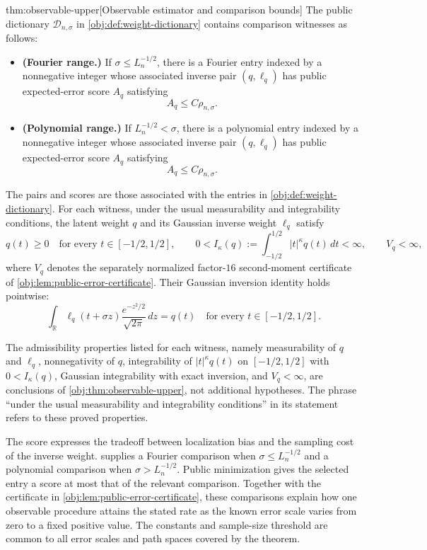 \documentclass[11pt]{article}
\begin{document}
\begin{theoremv}{thm:observable-upper}[Observable estimator and comparison bounds]
The public dictionary \(\mathcal D_{n,\sigma}\) in \cref{obj:def:weight-dictionary} contains comparison witnesses as follows:
\begin{itemize}
\item \textbf{(Fourier range.)} If \(\sigma\le L_n^{-1/2}\), there is a Fourier entry indexed by a nonnegative integer whose associated inverse pair \((q,\ell_q)\) has public expected-error score \(A_q\) satisfying
\[
A_q\le C\rho_{n,\sigma}.
\]
\item \textbf{(Polynomial range.)} If \(L_n^{-1/2}<\sigma\), there is a polynomial entry indexed by a nonnegative integer whose associated inverse pair \((q,\ell_q)\) has public expected-error score \(A_q\) satisfying
\[
A_q\le C\rho_{n,\sigma}.
\]
\end{itemize}
The pairs and scores are those associated with the entries in \cref{obj:def:weight-dictionary}. For each witness, under the usual measurability and integrability conditions, the latent weight \(q\) and its Gaussian inverse weight \(\ell_q\) satisfy
\[
q(t)\ge0
\quad\text{for every }t\in[-1/2,1/2],
\qquad
0<I_\kappa(q)
:=\int_{-1/2}^{1/2}|t|^\kappa q(t)\,dt<\infty,
\qquad
V_q<\infty,
\]
where \(V_q\) denotes the separately normalized factor-\(16\) second-moment certificate of \cref{obj:lem:public-error-certificate}. Their Gaussian inversion identity holds pointwise:
\[
\int_{\mathbb R}\ell_q(t+\sigma z)
       \frac{e^{-z^2/2}}{\sqrt{2\pi}}\,dz
=q(t)
\quad\text{for every }t\in[-1/2,1/2].
\]
\end{theoremv}

The admissibility properties listed for each witness, namely measurability of \(q\) and \(\ell_q\), nonnegativity of \(q\), integrability of \(|t|^\kappa q(t)\) on \([-1/2,1/2]\) with \(0<I_\kappa(q)\), Gaussian integrability with exact inversion, and \(V_q<\infty\), are conclusions of \cref{obj:thm:observable-upper}, not additional hypotheses. The phrase ``under the usual measurability and integrability conditions'' in its statement refers to these proved properties.

The score expresses the tradeoff between localization bias and the sampling cost of the inverse weight.  supplies a Fourier comparison when \(\sigma\le L_n^{-1/2}\) and a polynomial comparison when \(\sigma>L_n^{-1/2}\). Public minimization gives the selected entry a score at most that of the relevant comparison. Together with the certificate in \cref{obj:lem:public-error-certificate}, these comparisons explain how one observable procedure attains the stated rate as the known error scale varies from zero to a fixed positive value. The constants and sample-size threshold are common to all error scales and path spaces covered by the theorem.
\end{document}
